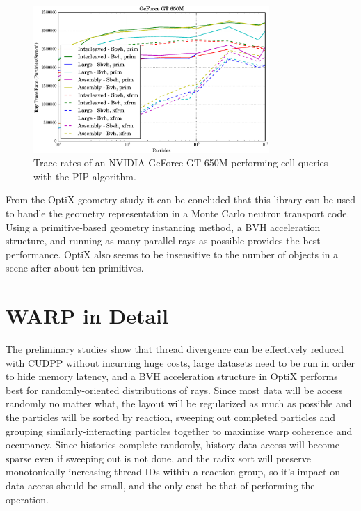 \begin{figure}[h!] 
  \centering
    \includegraphics[width=0.8\textwidth]{graphics/prelim_optix_G650M.eps}
     \caption{Trace rates of an NVIDIA GeForce GT 650M performing cell queries with the PIP algorithm. \label{prelim_optix_G650M} }
\end{figure}

From the OptiX geometry study it can be concluded that this library can be used to handle the geometry representation in a Monte Carlo neutron transport code.  Using a primitive-based geometry instancing method, a BVH acceleration structure, and running as many parallel rays as possible provides the best performance.  OptiX also seems to be insensitive to the number of objects in a scene after about ten primitives.


\section{WARP in Detail}

The preliminary studies show that thread divergence can be effectively reduced with CUDPP without incurring huge costs, large datasets need to be run in order to hide memory latency, and a BVH acceleration structure in OptiX performs best for randomly-oriented distributions of rays.  Since most data will be access randomly no matter what, the layout will be regularized as much as possible and the particles will be sorted by reaction, sweeping out completed particles and grouping similarly-interacting particles together to maximize warp coherence and occupancy.  Since histories complete randomly, history data access will become sparse even if sweeping out is not done, and the radix sort will preserve monotonically increasing thread IDs within a reaction group, so it's impact on data access should be small, and the only cost be that of performing the operation.

